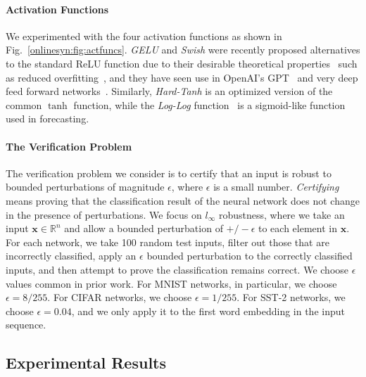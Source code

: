 \paragraph{Activation Functions}
We experimented with the four activation functions as shown in
Fig.~\ref{onlinesyn:fig:actfuncs}.
%
\emph{GELU} and \emph{Swish} were recently proposed
alternatives to the standard ReLU
function due to their desirable
theoretical properties~\cite{hendrycks2016gaussian} such as reduced
overfitting~\cite{singla2021low}, and they have seen use in
OpenAI's GPT~\cite{radford2018improving} and very deep feed forward
networks~\cite{ramachandran2017searching}.
%
Similarly, \emph{Hard-Tanh} is an optimized version of the common
$\tanh{}$ function, while the \emph{Log-Log}
function~\cite{gomes2008complementary} is a sigmoid-like function
used in forecasting.

\paragraph{The Verification Problem}
The verification problem we consider is to certify that an input is robust to
bounded perturbations of magnitude $ \epsilon $, where $\epsilon$ is a small number. \textit{Certifying} means
proving that the classification result of the neural network does not change in the presence of
perturbations. We focus on $ l_{\infty} $ robustness, where we take an input $
\mathbf{x} \in \mathbb{R}^n $ and allow a bounded perturbation of $ +/-
\epsilon $ to each element in $ \mathbf{x} $. For each network, we take 100
random test inputs, filter out those that are incorrectly classified, apply an
$ \epsilon $ bounded perturbation to the correctly classified inputs, and then
attempt to prove the classification remains correct. We choose $ \epsilon $
values common in prior work. For MNIST networks, in particular, we choose $ \epsilon = 8/255
$. For CIFAR networks, we  choose $ \epsilon = 1/255 $. For SST-2 networks, we
choose $ \epsilon = 0.04 $, and we only apply it to the first word embedding in
the input sequence.


\subsection{Experimental Results}


